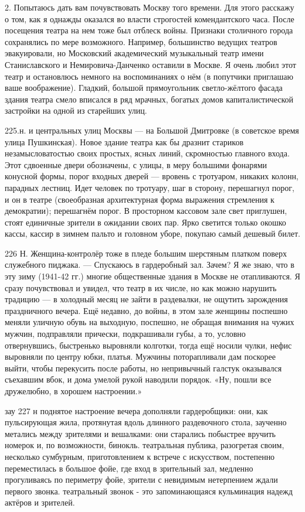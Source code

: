 2. Попытаюсь дать вам почувствовать Москву того времени. Для этого расскажу о том, как я однажды оказался во власти строгостей комендантского часа. После посещения театра на нем тоже был отблеск войны. Признаки столичного города сохранялись по мере возможного. Например, большинство ведущих театров эвакуировали, но Московский академический музыкальный театр имени Станиславского и Немировича-Данченко оставили в Москве. Я очень любил этот театр и остановлюсь немного на воспоминаниях о нём (в попутчики приглашаю ваше воображение). Гладкий, большой прямоугольник светло-жёлтого фасада здания театра смело вписался в ряд мрачных, богатых домов капиталистической застройки на одной из старейших улиц.

225.н. и центральных улиц Москвы — на Большой Дмитровке (в советское время улица Пушкинская). Новое здание театра как бы дразнит стариков незамысловатостью своих простых, ясных линий, скромностью главного входа. Этот сдвоенные двери обозначены, с улицы, в меру большими фонарями конусной формы, порог входных дверей — вровень с тротуаром, никаких колонн, парадных лестниц. Идет человек по тротуару, шаг в сторону, перешагнул порог, и он в театре (своеобразная архитектурная форма выражения стремления к демократии); перешагнём порог. В просторном кассовом зале свет приглушен, стоят единичные зрители в ожидании своих пар. Ярко светится только окошко кассы, кассир в зимнем пальто и головном уборе, покупаю самый дешевый билет.

226 Н. Женщина-контролёр тоже в пледе большим шерстяным платком поверх служебного пиджака. — Спускаюсь в гардеробный зал. Зачем? Я же знаю, что в эту зиму (1941-42 гг.) многие общественные здания в Москве не отапливаются. Я сразу почувствовал и увидел, что театр в их числе, но как можно нарушить традицию — в холодный месяц не зайти в раздевалки, не ощутить зарождения праздничного вечера. Ещё недавно, до войны, в этом зале женщины поспешно меняли уличную обувь на выходную, поспешно, не обращая внимания на чужих мужчин, подправляли прически, подкрашивали губы, а то, условно отвернувшись, быстренько выровняли колготки, тогда ещё носили чулки, нефис выровняли по центру юбки, платья. Мужчины поторапливали дам поскорее выйти, чтобы перекусить после работы, но непривычный галстук оказывался съехавшим вбок, и дома умелой рукой наводили порядок. «Ну, пошли все дружелюбно, в хорошем настроении.»

зау 227 н поднятое настроение вечера дополняли гардеробщики: они, как пульсирующая жила, протянутая вдоль длинного раздевочного стола, заученно метались между зрителями и вешалками: они старались побыстрее вручить номерок и, по возможности, бинокль. театральная публика, разогретая своим, несколько сумбурным, приготовлением к встрече с искусством, постепенно переместилась в большое фойе, где вход в зрительный зал, медленно прогуливаясь по периметру фойе, зрители с невидимым нетерпением ждали первого звонка. театральный звонок - это запоминающаяся кульминация надежд актёров и зрителей.

